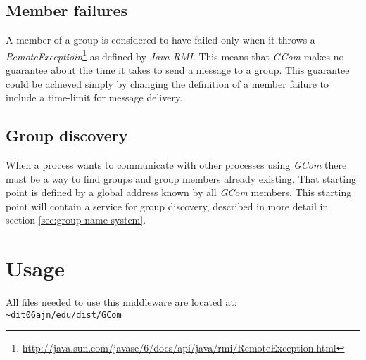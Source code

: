 \documentclass[titlepage, twocolumn, a4paper, 10pt]{article}
\def\pathtocode{\url{~dit06ajn/edu/dist/GCom}}
\begin{document}

\subsection{Member failures}\label{sec:member-failures}
A member of a group is considered to have failed only when it throws a
\textit{RemoteExceptioin}\footnote{\url{http://java.sun.com/javase/6/docs/api/java/rmi/RemoteException.html}}
as defined by \textit{Java RMI}. This means that \textit{GCom} makes
no guarantee about the time it takes to send a message to a group.
This guarantee could be achieved simply by changing the definition of
a member failure to include a time-limit for message delivery.

\subsection{Group discovery}\label{sec:group-discovery}
When a process wants to communicate with other processes using
\textit{GCom} there must be a way to find groups and group members
already existing. That starting point is defined by a global address
known by all \textit{GCom} members. This starting point will contain a
service for group discovery, described in more detail in section
\ref{sec:group-name-system}.


\section{Usage}\label{sec:usage}
All files needed to use this middleware are located at:\\
\texttt{\pathtocode}
\end{document}
